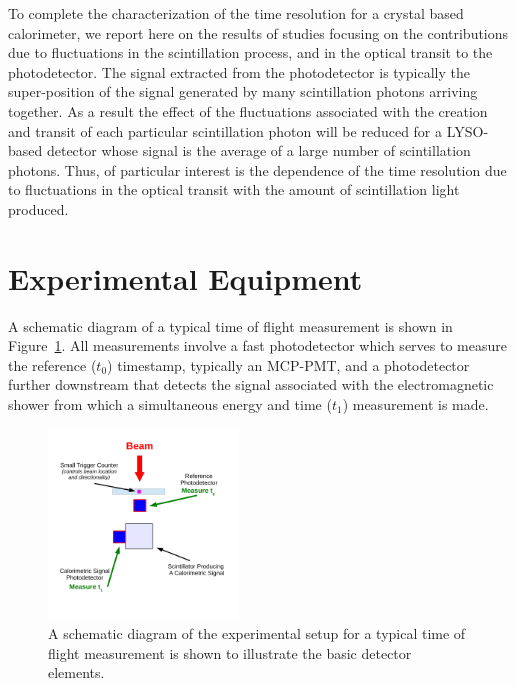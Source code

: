 \documentclass[12pt]{article}
\begin{document}
To complete the characterization of the time resolution
for a crystal based calorimeter, we report here on the results
of studies focusing on the contributions due to fluctuations
in the scintillation process, and in the optical transit
to the photodetector. The signal extracted from the photodetector is 
typically the super-position of the signal generated by many 
scintillation photons arriving together. As a result the effect of 
the fluctuations associated with the creation and transit of 
each particular scintillation photon will be reduced for a LYSO-based 
detector whose signal is the average of a large number of scintillation 
photons. Thus, of particular interest is the dependence of
the time resolution due to fluctuations in the optical transit
with the amount of scintillation light produced.


\section{Experimental Equipment}

A schematic diagram of a typical time of flight measurement
is shown in Figure~\ref{fig:TypicalSchematicDiagram}. All
measurements involve a fast photodetector which serves to
measure the reference ($t_{0}$) timestamp, typically 
an MCP-PMT, and a photodetector further downstream
that detects the signal associated with the
electromagnetic shower from which a simultaneous energy 
and time ($t_{1}$) measurement is made. 

\begin{figure}[H] \centering
\includegraphics[width=0.45\textwidth]{figs/TypicalSchematicDiagram} 
\caption{A schematic diagram of the experimental setup for
a typical time of flight measurement is shown to illustrate the
basic detector elements.} 
\label{fig:TypicalSchematicDiagram}
\end{figure}
\end{document}
